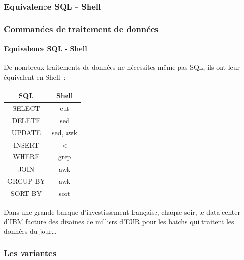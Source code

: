 \documentclass{beamer}
\begin{document}
    \subsubsection{Equivalence SQL - Shell}\label{subsubsec:equi-sql-shell}
    \begin{frame}
        \transdissolve
        \frametitle{Commandes de traitement de données}
        \framesubtitle{Equivalence SQL - Shell}
        De nombreux traitements de données ne nécessites même pas SQL, ils ont leur équivalent en Shell~:
        \begin{table}[ht]
            \centering
            \begin{tabular}{|c|c|}
                \hline
                \textbf{SQL} & \textbf{Shell} \\
                \hline
                SELECT       & cut            \\
                \hline
                DELETE       & sed            \\
                \hline
                UPDATE       & sed, awk       \\
                \hline
                INSERT       & <              \\
                \hline
                WHERE        & grep           \\
                \hline
                JOIN         & awk            \\
                \hline
                GROUP BY     & awk            \\
                \hline
                SORT BY      & sort           \\
                \hline
            \end{tabular}
        \end{table}
        Dans une grande banque d'investissement française, chaque soir, le data center d'IBM facture des dizaines de milliers d'EUR pour les batchs qui traitent les données du jour\ldots
    \end{frame}

    \subsubsection{Les variantes}\label{subsubsec:variantes}
\end{document}
